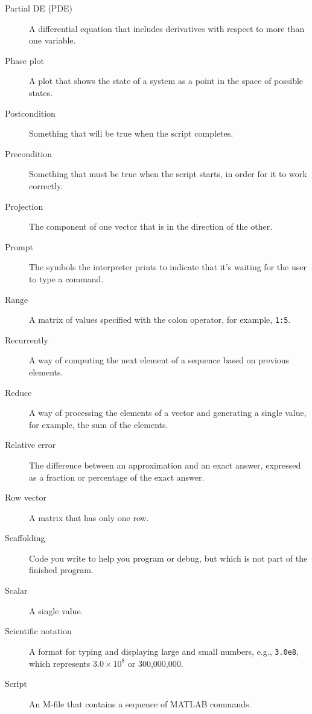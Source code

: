 \begin{description}
\item[Partial DE (PDE)] A differential equation that includes derivatives with respect to more than one variable.

\item[Phase plot] A plot that shows the state of a system as a point
in the space of possible states.

\item[Postcondition] Something that will be true when the script
completes.

\item[Precondition] Something that must be true when the script
starts, in order for it to work correctly.

\item[Projection] The component of one vector that is in the
direction of the other.

\item[Prompt] The symbols the interpreter prints to indicate that it's
waiting for the user to type a command.

\item[Range] A matrix of values specified with the colon operator, for example, \lstinline{1:5}.

\item[Recurrently] A way of computing the next element of a sequence
based on previous elements.

\item[Reduce] A way of processing the elements of a vector and
generating a single value, for example, the sum of the elements.

\item[Relative error] The difference between an approximation and
an exact answer, expressed as a fraction or percentage of the exact
answer.

\item[Row vector] A matrix that has only one row.

\item[Scaffolding] Code you write to help you program or debug, but
which is not part of the finished program.

\item[Scalar] A single value.

\item[Scientific notation] A format for typing and displaying large
and small numbers, e.g., \lstinline{3.0e8}, which represents $3.0 \times 10^8$
or 300,000,000.

\item[Script] An M-file that contains a sequence of MATLAB commands.


\end{description}
